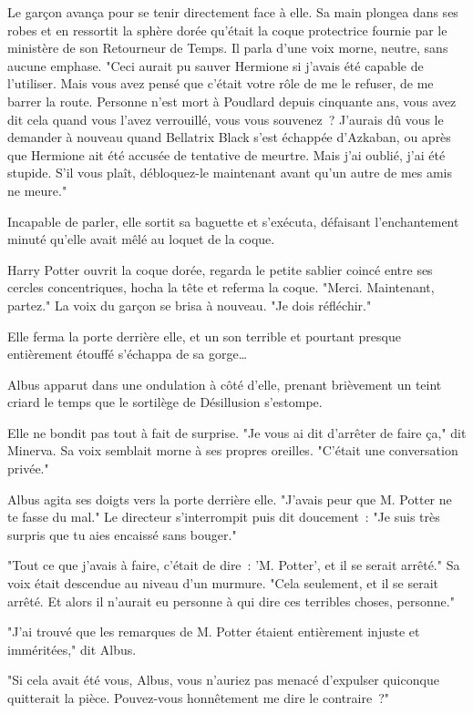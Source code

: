 Le garçon avança pour se tenir directement face à elle. Sa main plongea dans ses robes et en ressortit la sphère dorée qu'était la coque protectrice fournie par le ministère de son Retourneur de Temps. Il parla d'une voix morne, neutre, sans aucune emphase. "Ceci aurait pu sauver Hermione si j'avais été capable de l'utiliser. Mais vous avez pensé que c'était votre rôle de me le refuser, de me barrer la route. Personne n'est mort à Poudlard depuis cinquante ans, vous avez dit cela quand vous l'avez verrouillé, vous vous souvenez~? J'aurais dû vous le demander à nouveau quand Bellatrix Black s'est échappée d'Azkaban, ou après que Hermione ait été accusée de tentative de meurtre. Mais j'ai oublié, j'ai été stupide. S'il vous plaît, débloquez-le maintenant avant qu'un autre de mes amis ne meure."

Incapable de parler, elle sortit sa baguette et s'exécuta, défaisant l'enchantement minuté qu'elle avait mêlé au loquet de la coque.

Harry Potter ouvrit la coque dorée, regarda le petite sablier coincé entre ses cercles concentriques, hocha la tête et referma la coque. "Merci. Maintenant, partez." La voix du garçon se brisa à nouveau. "Je dois réfléchir."

\later

Elle ferma la porte derrière elle, et un son terrible et pourtant presque entièrement étouffé s'échappa de sa gorge…

Albus apparut dans une ondulation à côté d'elle, prenant brièvement un teint criard le temps que le sortilège de Désillusion s'estompe.

Elle ne bondit pas tout à fait de surprise. "Je vous ai dit d'arrêter de faire ça," dit Minerva. Sa voix semblait morne à ses propres oreilles. "C'était une conversation privée."

Albus agita ses doigts vers la porte derrière elle. "J'avais peur que M. Potter ne te fasse du mal." Le directeur s'interrompit puis dit doucement~: "Je suis très surpris que tu aies encaissé sans bouger."

"Tout ce que j'avais à faire, c'était de dire~: 'M. Potter', et il se serait arrêté." Sa voix était descendue au niveau d'un murmure. "Cela seulement, et il se serait arrêté. Et alors il n'aurait eu personne à qui dire ces terribles choses, personne."

"J'ai trouvé que les remarques de M. Potter étaient entièrement injuste et imméritées," dit Albus.

"Si cela avait été vous, Albus, vous n'auriez pas menacé d'expulser quiconque quitterait la pièce. Pouvez-vous honnêtement me dire le contraire~?"

